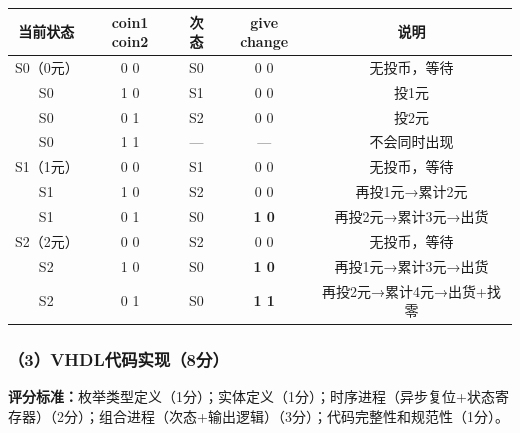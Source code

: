 \begin{center}
\begin{tabular}{|c|c|c|c|c|}
\hline
\textbf{当前状态} & \textbf{coin1 coin2} & \textbf{次态} & \textbf{give change} & \textbf{说明} \\
\hline
S0（0元） & 0 0 & S0 & 0 0 & 无投币，等待 \\
S0 & 1 0 & S1 & 0 0 & 投1元 \\
S0 & 0 1 & S2 & 0 0 & 投2元 \\
S0 & 1 1 & — & — & 不会同时出现 \\
\hline
S1（1元） & 0 0 & S1 & 0 0 & 无投币，等待 \\
S1 & 1 0 & S2 & 0 0 & 再投1元→累计2元 \\
S1 & 0 1 & S0 & \textbf{1 0} & 再投2元→累计3元→出货 \\
\hline
S2（2元） & 0 0 & S2 & 0 0 & 无投币，等待 \\
S2 & 1 0 & S0 & \textbf{1 0} & 再投1元→累计3元→出货 \\
S2 & 0 1 & S0 & \textbf{1 1} & 再投2元→累计4元→出货+找零 \\
\hline
\end{tabular}
\end{center}

\subsubsection{（3）VHDL代码实现（8分）}

\begin{framed}
\textbf{评分标准：}枚举类型定义（1分）；实体定义（1分）；时序进程（异步复位+状态寄存器）（2分）；组合进程（次态+输出逻辑）（3分）；代码完整性和规范性（1分）。
\end{framed}

